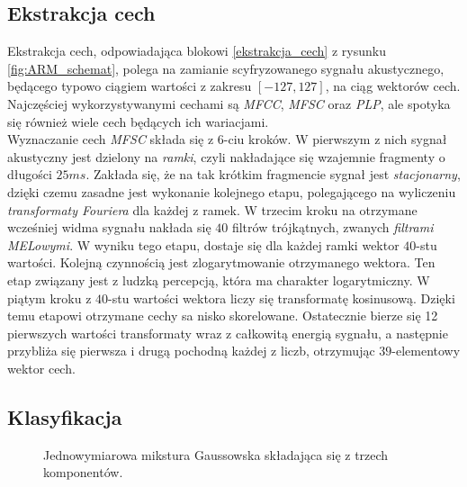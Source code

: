 \documentclass[a4paper,11pt,onecolumn,twoside,openright,titlepage]{article}
\newcommand{\refBlock}[1]{
	\hyperref[#1]{\ref*{#1}}
}
\begin{document}
	\subsection{Ekstrakcja cech}
		Ekstrakcja cech, odpowiadająca blokowi \refBlock{ekstrakcja_cech} z rysunku \ref{fig:ARM_schemat}, polega na zamianie scyfryzowanego sygnału akustycznego, będącego typowo ciągiem wartości z zakresu $[-127, 127]$, na ciąg wektorów cech. Najczęściej wykorzystywanymi cechami są \textit{MFCC}, \textit{MFSC} oraz \textit{PLP}, ale spotyka się również wiele cech będących ich wariacjami.
		\\
		Wyznaczanie cech \textit{MFSC} składa się z $6$-ciu kroków.
		W pierwszym z nich sygnał akustyczny jest dzielony na \textit{ramki}, czyli nakładające się wzajemnie fragmenty o długości $25ms$. Zakłada się, że na tak krótkim fragmencie sygnał jest \textit{stacjonarny}, dzięki czemu zasadne jest wykonanie kolejnego etapu,
		polegającego na wyliczeniu \textit{transformaty Fouriera} dla każdej z ramek.
		W trzecim kroku na otrzymane wcześniej widma sygnału nakłada się $40$ filtrów trójkątnych, zwanych \textit{filtrami MELowymi}. W wyniku tego etapu, dostaje się dla każdej ramki wektor $40$-stu wartości. Kolejną czynnością jest zlogarytmowanie otrzymanego wektora. Ten etap związany jest z ludzką percepcją, która ma charakter logarytmiczny. W piątym kroku z $40$-stu wartości wektora liczy się transformatę kosinusową. Dzięki temu etapowi otrzymane cechy sa nisko skorelowane. Ostatecznie bierze się 12 pierwszych wartości transformaty wraz z całkowitą energią sygnału, a następnie przybliża się pierwsza i drugą pochodną każdej z liczb, otrzymując $39$-elementowy wektor cech.
		
	\subsection{Klasyfikacja}
	
		\begin{figure}[H]
			\centering
			\label{fig:gmm}
			\caption{Jednowymiarowa mikstura Gaussowska składająca się z trzech komponentów.}
		\end{figure}
\end{document}
